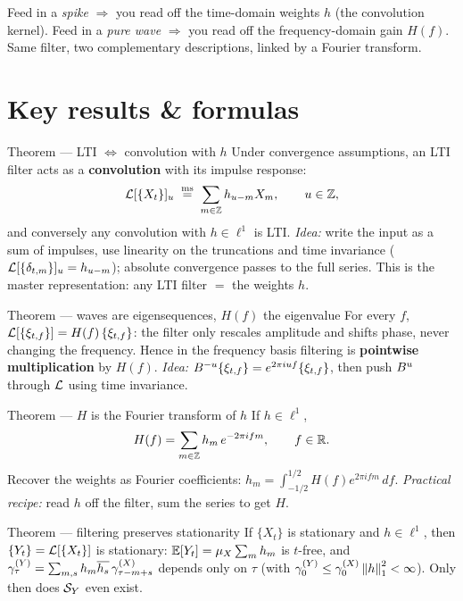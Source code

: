 \documentclass[11pt]{article}
\begin{document}
\begin{intu}
Feed in a \emph{spike} $\Rightarrow$ you read off the time-domain weights $h$ (the convolution kernel). Feed in a \emph{pure wave} $\Rightarrow$ you read off the frequency-domain gain $H(f)$. Same filter, two complementary descriptions, linked by a Fourier transform.
\end{intu}

\section*{Key results \& formulas}

\begin{result}{Theorem --- LTI $\Leftrightarrow$ convolution with $h$}
Under convergence assumptions, an LTI filter acts as a \textbf{convolution} with its impulse response:
\[
\mathcal{L}[\{X_t\}]_u\;\overset{\mathrm{ms}}{=}\;\sum_{m\in\mathbb{Z}}h_{u-m}X_m,\qquad u\in\mathbb{Z},
\]
and conversely any convolution with $h\in\ell^1$ is LTI. \emph{Idea:} write the input as a sum of impulses, use linearity on the truncations and time invariance ($\mathcal{L}[\{\delta_{t,m}\}]_u=h_{u-m}$); absolute convergence passes to the full series. This is the master representation: any LTI filter $=$ the weights $h$.
\end{result}

\begin{result}{Theorem --- waves are eigensequences, $H(f)$ the eigenvalue}
For every $f$, $\mathcal{L}[\{\xi_{t,f}\}]=H(f)\,\{\xi_{t,f}\}$: the filter only rescales amplitude and shifts phase, never changing the frequency. Hence in the frequency basis filtering is \textbf{pointwise multiplication} by $H(f)$. \emph{Idea:} $B^{-u}\{\xi_{t,f}\}=e^{2\pi i u f}\{\xi_{t,f}\}$, then push $B^u$ through $\mathcal{L}$ using time invariance.
\end{result}

\begin{result}{Theorem --- $H$ is the Fourier transform of $h$}
If $h\in\ell^1$,
\[
H(f)=\sum_{m\in\mathbb{Z}}h_m\,e^{-2\pi i f m},\qquad f\in\mathbb{R}.
\]
Recover the weights as Fourier coefficients: $h_m=\int_{-1/2}^{1/2}H(f)e^{2\pi i f m}\,df$. \emph{Practical recipe:} read $h$ off the filter, sum the series to get $H$.
\end{result}

\begin{result}{Theorem --- filtering preserves stationarity}
If $\{X_t\}$ is stationary and $h\in\ell^1$, then $\{Y_t\}=\mathcal{L}[\{X_t\}]$ is stationary: $\mathbb{E}[Y_t]=\mu_X\sum_m h_m$ is $t$-free, and $\gamma^{(Y)}_\tau=\sum_{m,s}h_m\overline{h_s}\,\gamma^{(X)}_{\tau-m+s}$ depends only on $\tau$ (with $\gamma^{(Y)}_0\le\gamma^{(X)}_0\left\lVert h \right\rVert_1^2<\infty$). Only then does $\mathcal{S}_Y$ even exist.
\end{result}
\end{document}
